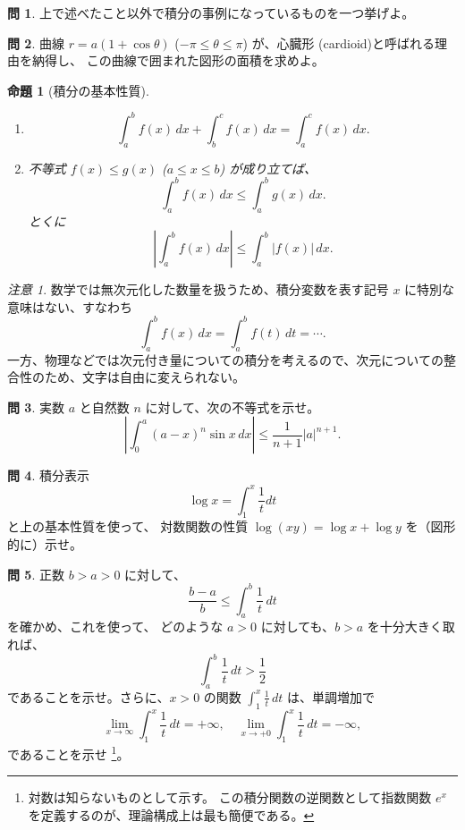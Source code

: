 \documentclass[a4paper]{jsarticle}
\newtheorem{Proposition}[Theorem]{命題}
\theoremstyle{definition}
\newtheorem{Exercise}{問}%
\theoremstyle{remark}
\newtheorem{Remark}{注意}
\begin{document}
\begin{Exercise}
上で述べたこと以外で積分の事例になっているものを一つ挙げよ。
\end{Exercise}

\begin{Exercise}
曲線 $r = a(1+\cos\theta)$ ($-\pi \leq \theta \leq \pi$) が、心臓形 (cardioid)と呼ばれる理由を納得し、
この曲線で囲まれた図形の面積を求めよ。
\end{Exercise}

\begin{Proposition}[積分の基本性質]~
  \begin{enumerate}
  \item
\[
\int_a^b f(x)\,dx + \int_b^c f(x)\,dx = \int_a^c f(x)\,dx.
\]
\item
不等式 $f(x) \leq g(x)$ ($a \leq x \leq b$) が成り立てば、
\[
\int_a^b f(x)\,dx \leq \int_a^b g(x)\,dx. 
\]
とくに
\[
\left|
\int_a^b f(x)\,dx
\right|
\leq
\int_a^b |f(x)|\,dx. 
\]
  \end{enumerate}
\end{Proposition}

\begin{Remark}
{\small
数学では無次元化した数量を扱うため、積分変数を表す記号 $x$ に特別な意味はない、すなわち
\[
\int_a^b f(x)\,dx = \int_a^b f(t)\,dt = \cdots.
\]
一方、物理などでは次元付き量についての積分を考えるので、次元についての整合性のため、文字は自由に変えられない。}
\end{Remark}


\begin{Exercise}
実数 $a$ と自然数 $n$ に対して、次の不等式を示せ。
\[
\left| 
\int_0^a (a-x)^n \sin x\, dx 
\right| \leq \frac{1}{n+1} |a|^{n+1}.  
\]
\end{Exercise} 

\begin{Exercise}
積分表示
\[
\log x = \int_1^x \frac{1}{t} dt
\]
と上の基本性質を使って、
対数関数の性質 $\log(xy) = \log x + \log y$ を（図形的に）示せ。
\end{Exercise}

\begin{Exercise}
正数 $b>a>0$ に対して、
\[
\frac{b-a}{b} \leq \int_a^b \frac{1}{t}\, dt
\]
を確かめ、これを使って、
どのような $a>0$ に対しても、$b>a$ を十分大きく取れば、
\[
\int_a^b \frac{1}{t}\, dt > \frac{1}{2}
\]
であることを示せ。さらに、$x > 0$ の関数
$\displaystyle
\int_1^x \frac{1}{t}\, dt
$
は、単調増加で
\[
\lim_{x \to \infty} \int_1^x \frac{1}{t}\,dt = +\infty, 
\quad 
\lim_{x \to +0} \int_1^x \frac{1}{t}\,dt = -\infty, 
\]
であることを示せ
\footnote{対数は知らないものとして示す。
この積分関数の逆関数として指数関数 $e^x$ を定義するのが、理論構成上は最も簡便である。}。
\end{Exercise}
\end{document}
